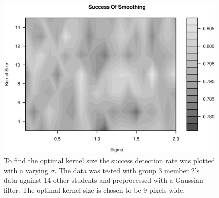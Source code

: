 \begin{figure}
\centering
\includegraphics[width = \textwidth]{graphics/success_of_smoothing_contour}
\caption{To find the optimal kernel size the success detection rate was plotted with a varying $\sigma$.
The data was tested with group 3 member 2's data against 14 other students and preprocessed with a Gaussian filter. 
The optimal kernel size is chosen to be 9 pixels wide.
}
\end{figure}
